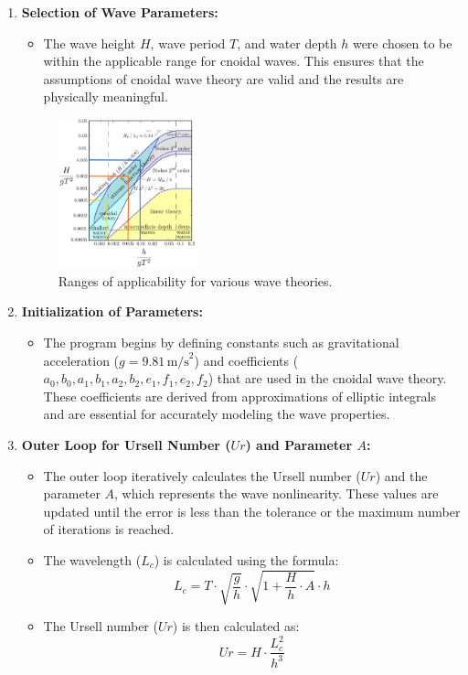 \documentclass[a4paper]{article}
\begin{document}
\begin{enumerate}
    \item \textbf{Selection of Wave Parameters:}
    \begin{itemize}
        \item The wave height \(H\), wave period \(T\), and water depth \(h\) were chosen to be within the applicable range for cnoidal waves. This ensures that the assumptions of cnoidal wave theory are valid and the results are physically meaningful.
    \end{itemize}

    \begin{figure}[H]
        \centering
        \includegraphics[width=0.38\textwidth]{CE591HW1-Q4.1.png}
        \caption{\small Ranges of applicability for various wave theories.}
        \label{fig:wavetheory}
    \end{figure}

    \item \textbf{Initialization of Parameters:}
    \begin{itemize}
        \item The program begins by defining constants such as gravitational acceleration (\(g = 9.81 \, \text{m/s}^2\)) and coefficients (\(a_0, b_0, a_1, b_1, a_2, b_2, e_1, f_1, e_2, f_2\)) that are used in the cnoidal wave theory. These coefficients are derived from approximations of elliptic integrals and are essential for accurately modeling the wave properties.
    \end{itemize}

    \item \textbf{Outer Loop for Ursell Number (\(Ur\)) and Parameter \(A\):}
    \begin{itemize}
        \item The outer loop iteratively calculates the Ursell number (\(Ur\)) and the parameter \(A\), which represents the wave nonlinearity. These values are updated until the error is less than the tolerance or the maximum number of iterations is reached.
        \item The wavelength (\(L_c\)) is calculated using the formula:
        \[
        L_c = T \cdot \sqrt{\frac{g}{h}} \cdot \sqrt{1 + \frac{H}{h} \cdot A} \cdot h
        \]
        \item The Ursell number (\(Ur\)) is then calculated as:
        \[
        Ur = H \cdot \frac{L_c^2}{h^3}
        \]
    \end{itemize}


\end{enumerate}
\end{document}

